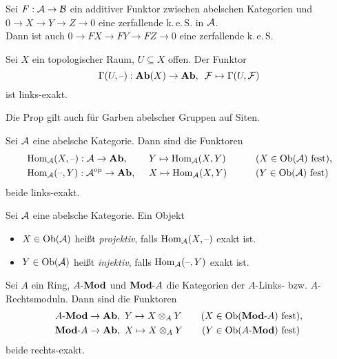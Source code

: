 \documentclass{cheat-sheet}
\newcommand{\keS}{k.\,e.\,S.} %
\newcommand{\AMod}{\text{$A$-$\Mod$}} %
\newcommand{\ModA}{\text{$\Mod$-$A$}} %
\begin{document}
\begin{defn}
  Sei $F : \mathcal{A} \to \mathcal{B}$ ein additiver Funktor zwischen abelschen Kategorien und $0 \to X \to Y \to Z \to 0$ eine zerfallende \keS{} in $\mathcal{A}$. \\
  Dann ist auch $0 \to FX \to FY \to FZ \to 0$ eine zerfallende \keS{}
\end{defn}

\begin{prop}
  Sei $X$ ein topologischer Raum, $U \subseteq X$ offen. Der Funktor
  \[ \Gamma(U, \text{--}) : \mathbf{Ab}(X) \to \mathbf{Ab}, \enspace \mathcal{F} \mapsto \Gamma(U, \mathcal{F}) \]
  ist links-exakt.
\end{prop}

\begin{bem}
  Die Prop gilt auch für Garben abelscher Gruppen auf Siten.
\end{bem}

\begin{prop}
  Sei $\mathcal{A}$ eine abelsche Kategorie. Dann sind die Funktoren
  \begin{alignat*}{5}
    & \operatorname{Hom}_{\mathcal{A}}(X, \text{--}) : \mathcal{A} \to \mathbf{Ab}, \enspace && Y \mapsto \operatorname{Hom}_{\mathcal{A}}(X, Y) \qquad && \text{($X \in \operatorname{Ob}(\mathcal{A})$ fest)}, \\
    & \operatorname{Hom}_{\mathcal{A}}(\text{--}, Y) : \mathcal{A}^{\mathrm{op}} \to \mathbf{Ab}, \enspace && X \mapsto \operatorname{Hom}_{\mathcal{A}}(X, Y) \qquad && \text{($Y \in \operatorname{Ob}(\mathcal{A})$ fest)}
  \end{alignat*}
  beide links-exakt.
\end{prop}

\begin{defn}
  Sei $\mathcal{A}$ eine abelsche Kategorie. Ein Objekt
  \begin{itemize}
    \item $X \in \operatorname{Ob}(\mathcal{A})$ heißt \emph{projektiv}, falls $\operatorname{Hom}_{\mathcal{A}}(X, \text{--})$ exakt ist.
    \item $Y \in \operatorname{Ob}(\mathcal{A})$ heißt \emph{injektiv}, falls $\operatorname{Hom}_{\mathcal{A}}(\text{--}, Y)$ exakt ist.
  \end{itemize}
\end{defn}

\begin{prop}
  Sei $A$ ein Ring, $\AMod$ und $\ModA$ die Kategorien der $A$-Links- bzw. $A$-Rechtsmoduln.
  Dann sind die Funktoren
  \begin{align*}
    \AMod \to \AbGrp, \enspace & Y \mapsto X \otimes_A Y \qquad \text{($X \in \Ob(\ModA)$ fest)}, \\
    \ModA \to \AbGrp, \enspace & X \mapsto X \otimes_A Y \qquad \text{($Y \in \Ob(\AMod)$ fest)}
  \end{align*}
  beide rechts-exakt.
\end{prop}
\end{document}
